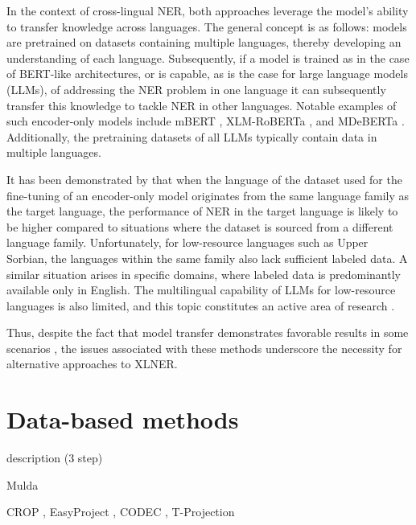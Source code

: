 In the context of cross-lingual NER, both approaches leverage the model's ability to transfer knowledge
across languages. The general concept is as follows: models are pretrained on datasets containing
multiple languages, thereby developing an understanding of each language. Subsequently, if a model
is trained as in the case of BERT-like architectures, or is capable, as is the case for large language models (LLMs),
of addressing the NER problem in one language it can subsequently transfer this knowledge to tackle
NER in other languages. Notable examples of such encoder-only models include mBERT
\cite{devlin-etal-2019-bert}, XLM-RoBERTa \cite{conneau-etal-2020-unsupervised-xlmr}, and
MDeBERTa \cite{He2020DeBERTaDB,He2021DeBERTaV3ID}. Additionally, the pretraining datasets
of all LLMs typically contain data in multiple languages.

It has been demonstrated by \cite{torge-etal-2023-named} that when the language of the dataset used for the
fine-tuning of an encoder-only model originates from the same language family as the target
language, the performance of NER in the target language is likely to be higher compared to situations
where the dataset is sourced from a different language family. Unfortunately, for low-resource
languages such as Upper Sorbian, the languages within the same family also lack sufficient labeled data.
A similar situation arises in specific domains, where labeled data is predominantly available only in English.
The multilingual capability of LLMs for low-resource languages is also limited,
and this topic constitutes an active area of research \cite{lai-etal-2024-llms}.

Thus, despite the fact that model transfer demonstrates favorable results in some
scenarios \cite{garcia-ferrero-etal-2022-model}, the issues associated with these methods
underscore the necessity for alternative approaches to XLNER.

\section{Data-based methods}

\begin{definition}

\end{definition}


description (3 step)

Mulda \cite{liu-etal-2021-mulda}

CROP \cite{yang-etal-2022-crop}, EasyProject \cite{chen-etal-2023-frustratingly}, CODEC \cite{Le2024ConstrainedDF},
T-Projection \cite{garcia-ferrero-etal-2023-projection}

